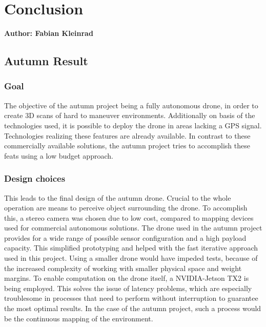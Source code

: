 \chapter{Conclusion}

\textbf{Author: Fabian Kleinrad} 

\section{Autumn Result}

\subsection{Goal}
The objective of the autumn project being a fully autonomous drone, in order to create 3D scans of hard to maneuver environments. Additionally on basis of the technologies used, it is possible to deploy the drone in areas lacking a GPS signal. Technologies realizing these features are already available. In contrast to these commercially available solutions, the autumn project tries to accomplish these feats using a low budget approach. 

\subsection{Design choices}
This leads to the final design of the autumn drone.\newline
Crucial to the whole operation are means to perceive object surrounding the drone. To accomplish this, a stereo camera was chosen due to low cost, compared to mapping devices used for commercial autonomous solutions.\newline
The drone used in the autumn project provides for a wide range of possible sensor configuration and a high payload capacity. This simplified prototyping and helped with the fast iterative approach used in this project. Using a smaller drone would have impeded tests, because of the increased complexity of working with smaller physical space and weight margins.\newline
To enable computation on the drone itself, a NVIDIA-Jetson TX2 is being employed. This solves the issue of latency problems, which are especially troublesome in processes that need to perform without interruption to guarantee the most optimal results. In the case of the autumn project, such a process would be the continuous mapping of the environment.

\pagebreak
